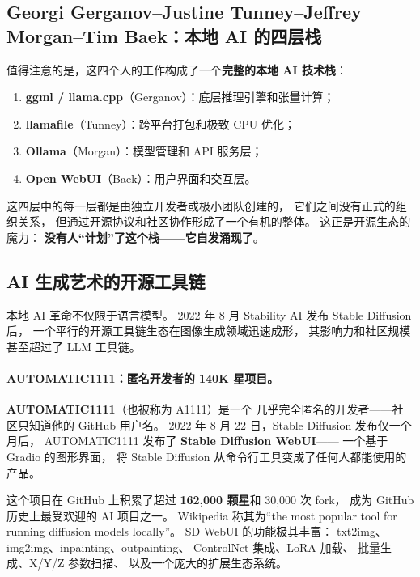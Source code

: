 \subsection{Georgi Gerganov--Justine Tunney--Jeffrey Morgan--Tim Baek：本地 AI 的四层栈}

值得注意的是，这四个人的工作构成了一个\textbf{完整的本地 AI 技术栈}：

\begin{enumerate}[noitemsep]
  \item \textbf{ggml / llama.cpp}（Gerganov）：底层推理引擎和张量计算；
  \item \textbf{llamafile}（Tunney）：跨平台打包和极致 CPU 优化；
  \item \textbf{Ollama}（Morgan）：模型管理和 API 服务层；
  \item \textbf{Open WebUI}（Baek）：用户界面和交互层。
\end{enumerate}

这四层中的每一层都是由独立开发者或极小团队创建的，
它们之间没有正式的组织关系，
但通过开源协议和社区协作形成了一个有机的整体。
这正是开源生态的魔力：
\textbf{没有人``计划''了这个栈——它自发涌现了}。


\subsection{AI 生成艺术的开源工具链}
\label{subsec:sd-toolchain}

本地 AI 革命不仅限于语言模型。
2022 年 8 月 Stability AI 发布 Stable Diffusion 后，
一个平行的开源工具链生态在图像生成领域迅速成形，
其影响力和社区规模甚至超过了 LLM 工具链。

\paragraph{AUTOMATIC1111：匿名开发者的 140K 星项目。}
\textbf{AUTOMATIC1111}（也被称为 A1111）是一个
几乎完全匿名的开发者——社区只知道他的 GitHub 用户名。
2022 年 8 月 22 日，Stable Diffusion 发布仅一个月后，
AUTOMATIC1111 发布了 \textbf{Stable Diffusion WebUI}——
一个基于 Gradio 的图形界面，
将 Stable Diffusion 从命令行工具变成了任何人都能使用的产品。

这个项目在 GitHub 上积累了超过 \textbf{162,000 颗星}和 30,000 次 fork，
成为 GitHub 历史上最受欢迎的 AI 项目之一。
Wikipedia 称其为``the most popular tool for running diffusion models locally''。
SD WebUI 的功能极其丰富：
txt2img、img2img、inpainting、outpainting、
ControlNet 集成、LoRA 加载、
批量生成、X/Y/Z 参数扫描、
以及一个庞大的扩展生态系统。

